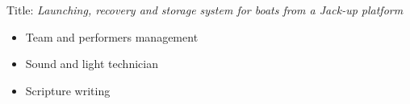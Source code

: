 \documentclass[10pt,a4paper]{../altacv}
\begin{document}
Title: \emph{Launching, recovery and storage system for boats from a Jack-up platform}

\divider

\begin{itemize}[leftmargin=7mm]
\item Team and performers management
\item Sound and light technician
\item Scripture writing
\end{itemize}






\end{document}
